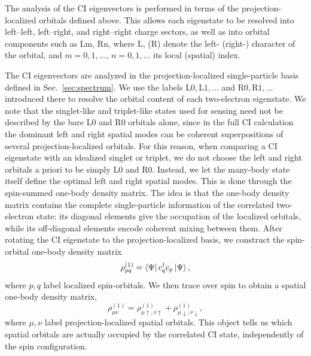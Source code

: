 \documentclass[fleqn,10pt]{wlscirep}
\begin{document}
The analysis of the CI eigenvectors is performed in terms of the projection-localized orbitals defined above.  This allows each eigenstate to be resolved into left--left, left--right, and right--right charge sectors, as well as
into orbital components such as $\mathrm{Lm}$, $\mathrm{Rn}$, where  $\mathrm{L}$, ($\mathrm{R}$) denote the left- (right-) character of the orbital, and  $m=0,1,\dots$, $n=0,1,\dots$ its local (spatial) index. 

The CI eigenvectors are analyzed in the projection-localized single-particle basis defined in Sec.~\ref{sec:spectrum}.  We use the labels $\mathrm{L0},\mathrm{L1},\dots$ and $\mathrm{R0},\mathrm{R1},\dots$ introduced there to resolve the orbital content of each two-electron eigenstate.  We note that the
singlet-like and triplet-like states used for sensing need not be described by the
bare $\mathrm{L0}$ and $\mathrm{R0}$ orbitals alone, since in the full CI calculation the
dominant left and right spatial modes can be coherent superpositions of several
projection-localized orbitals.
For this reason, when comparing a CI eigenstate with an idealized singlet or triplet, we do not choose the left and right orbitals a priori to be simply $\mathrm{L0}$ and $\mathrm{R0}$.  Instead, we let the many-body state itself define the optimal left and right spatial modes. This is done through the spin-summed one-body density matrix.  The idea is that the one-body density matrix contains the complete single-particle information of the correlated two-electron state: its diagonal elements give the occupation of the localized orbitals, while its off-diagonal elements encode coherent mixing between them. After rotating the CI eigenstate to the projection-localized basis, we
construct the spin-orbital one-body density matrix
\begin{equation}
  \rho^{(1)}_{pq}
  =
  \bra{\Psi}
  c_q^\dagger c_p
  \ket{\Psi},
\end{equation}
where $p,q$ label localized spin-orbitals.  We then trace over spin to obtain a
spatial one-body density matrix,
\begin{equation}
  \rho^{(1)}_{\mu\nu}
  =
  \rho^{(1)}_{\mu\uparrow,\nu\uparrow}
  +
  \rho^{(1)}_{\mu\downarrow,\nu\downarrow},
\end{equation}
where $\mu,\nu$ label projection-localized spatial orbitals.  This object tells us which spatial orbitals are actually occupied by the correlated CI state, independently of the spin configuration.
\end{document}
